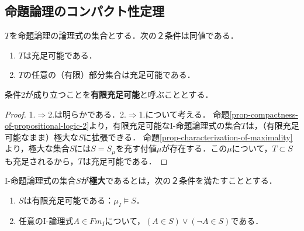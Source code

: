 \documentclass[uplatex, 12pt, dvipdfmx]{jsreport}
\begin{document}
\subsection{命題論理のコンパクト性定理}
\begin{shadebox}
\begin{theorem}[命題論理のコンパクト性定理]
    $T$を命題論理の論理式の集合とする．次の２条件は同値である．
    \begin{enumerate}
        \item $T$は充足可能である．
        \item $T$の任意の（有限）部分集合は充足可能である．
    \end{enumerate}
    条件2が成り立つことを\textbf{有限充足可能}と呼ぶこととする．
\end{theorem}
\begin{proof}
    1.$\Rightarrow$2.は明らかである．2.$\Rightarrow$1.について考える．
    命題\ref{prop-compactness-of-propositional-logic-2}より，有限充足可能なI-命題論理式の集合$T$は，（有限充足可能なまま）極大な$S$に拡張できる．
    命題\ref{prop-characterization-of-maximality}より，極大な集合$S$には$S=S_\mu$を充す付値$\mu$が存在する．この$\mu$について，$T\subset S$も充足されるから，$T$は充足可能である．
\end{proof}
\end{shadebox}

\begin{definition}[maximal]
    I-命題論理式の集合$S$が\textbf{極大}であるとは，次の２条件を満たすこととする．
    \begin{enumerate}
        \item $S$は有限充足可能である：$\mu_I\vDash S$．
        \item 任意のI-論理式$A\in Fm_I$について，$(A\in S)\lor(\lnot A\in S)$である．
    \end{enumerate}
\end{definition}
\end{document}
